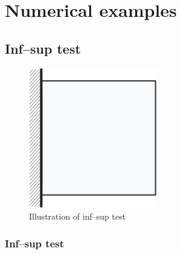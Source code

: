 \section{Numerical examples}

\subsection{Inf--sup test}

\begin{figure}[!ht]
\centering
\includegraphics[width=0.5\textwidth]{png/infsup_model.png}
\caption{Illustration of inf--sup test}\label{infsup_illsutration}
\end{figure}

\subsubsection{Inf--sup test}

